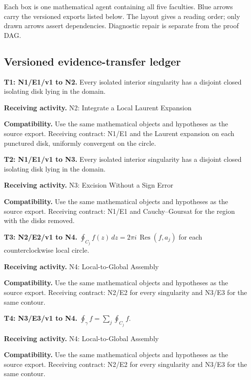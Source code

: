 \documentclass[preprint,12pt,aps,pra,showkeys,amsmath,amssymb,superscriptaddress,floatfix]{revtex4-2}
\theoremstyle{definition}
\theoremstyle{remark}
\newcommand{\field}[2]{\par\smallskip\noindent\textbf{#1.} #2\par}
\begin{document}
Each box is one mathematical agent containing all five faculties. Blue
arrows carry the versioned exports listed below. The layout gives a
reading order; only drawn arrows assert dependencies. Diagnostic repair
is separate from the proof DAG.

\clearpage\subsection{Versioned evidence-transfer ledger}

\begingroup\small\linespread{1.05}\selectfont

\field{T1: N1/E1/v1 to N2}{Every isolated interior singularity has a disjoint closed isolating disk
lying in the domain.}

\field{Receiving activity}{N2: Integrate a Local Laurent Expansion}

\field{Compatibility}{Use the same mathematical objects and hypotheses as the source export.
Receiving contract: N1/E1 and the Laurent expansion on each punctured
disk, uniformly convergent on the circle.}

\field{T2: N1/E1/v1 to N3}{Every isolated interior singularity has a disjoint closed isolating disk
lying in the domain.}

\field{Receiving activity}{N3: Excision Without a Sign Error}

\field{Compatibility}{Use the same mathematical objects and hypotheses as the source export.
Receiving contract: N1/E1 and Cauchy--Goursat for the region with the
disks removed.}

\field{T3: N2/E2/v1 to N4}{\(\oint_{C_j}f(z)\,dz=2\pi i\,\operatorname{Res}(f,a_j)\) for each
counterclockwise local circle.}

\field{Receiving activity}{N4: Local-to-Global Assembly}

\field{Compatibility}{Use the same mathematical objects and hypotheses as the source export.
Receiving contract: N2/E2 for every singularity and N3/E3 for the same
contour.}

\field{T4: N3/E3/v1 to N4}{\(\oint_\gamma f=\sum_j\oint_{C_j}f\).}

\field{Receiving activity}{N4: Local-to-Global Assembly}

\field{Compatibility}{Use the same mathematical objects and hypotheses as the source export.
Receiving contract: N2/E2 for every singularity and N3/E3 for the same
contour.}
\end{document}
